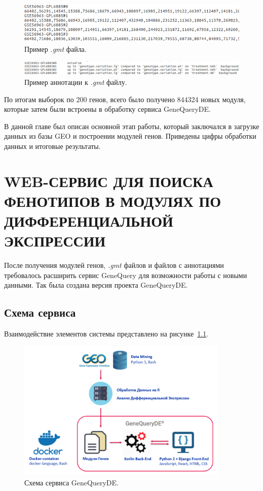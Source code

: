 \documentclass[times,specification,annotation]{itmo-student-thesis}
\begin{document}
\begin{figure}[!h]
    \caption{Пример \textit{.gmt} файла.}\label{gmt}
    \centering
    \includegraphics[width=1\textwidth]{gmt.png}
\end{figure}

\begin{figure}[!h]
    \caption{Пример аннотации к \textit{.gmt} файлу.}\label{annot}
    \centering
    \includegraphics[width=1\textwidth]{gmt_annot.png}
\end{figure}

По итогам выборок по 200 генов, всего было получено 844324 новых модуля, которые затем были встроены в обработку сервиса GeneQueryDE.

\chapterconclusion

В данной главе был описан основной этап работы, который заключался в загрузке данных из базы GEO и построении модулей генов. Приведены цифры обработки данных и итоговые результаты.  


\chapter{WEB-СЕРВИС ДЛЯ ПОИСКА ФЕНОТИПОВ В МОДУЛЯХ ПО ДИФФЕРЕНЦИАЛЬНОЙ ЭКСПРЕССИИ}

После получения модулей генов, \textit{.gmt} файлов и файлов с аннотациями требовалось расширить сервис GeneQuery для возможности работы с новыми данными. Так была создана версия проекта GeneQueryDE. 

\section{Схема сервиса}

Взаимодействие элементов системы представлено на рисунке~\ref{service}. 

\begin{figure}[!h]
    \caption{Схема сервиса GeneQueryDE.}\label{service}
    \centering
    \includegraphics[width=0.9\textwidth]{GeneQueryDE_scheme}
\end{figure}
\end{document}
